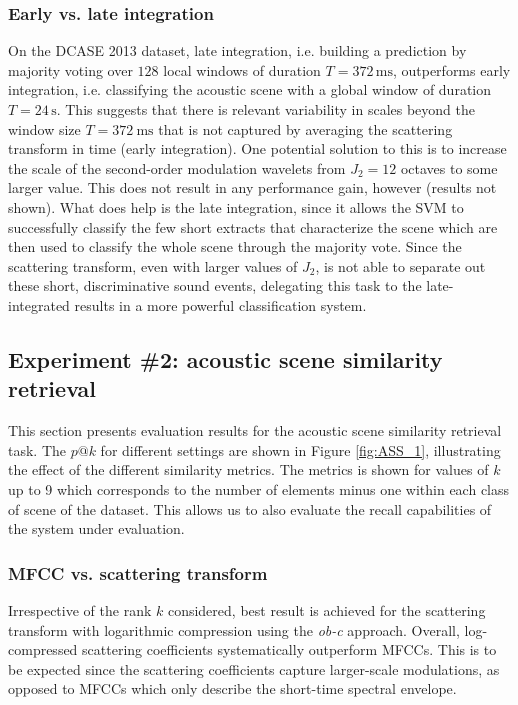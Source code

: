 \documentclass[journal]{IEEEtran}
\makeatletter
\newcommand*{\ie}{i.e.\@\xspace}
\newcommand*{\vs}{vs.\@\xspace}
\makeatother
\begin{document}
\subsubsection*{Early \vs late integration}
On the DCASE 2013 dataset, late integration, \ie building a prediction by majority voting over $128$ local windows of duration $T=372\,\mathrm{ms}$, outperforms early integration, \ie classifying the acoustic scene with a global window of duration $T=24\,\mathrm{s}$.
This suggests that there is relevant variability in scales beyond the window size $T = 372~\mathrm{ms}$ that is not captured by averaging the scattering transform in time (early integration). One potential solution to this is to increase the scale of the second-order modulation wavelets from $J_2 = 12$ octaves to some larger value. This does not result in any performance gain, however (results not shown). What does help is the late integration, since it allows the SVM to successfully classify the few short extracts that characterize the scene which are then used to classify the whole scene through the majority vote. Since the scattering transform, even with larger values of $J_2$, is not able to separate out these short, discriminative sound events, delegating this task to the late-integrated results in a more powerful classification system.

\subsection{Experiment \#2: acoustic scene similarity retrieval}

This section presents evaluation results for the acoustic scene similarity retrieval task. The $p@k$ for different settings are shown in Figure \ref{fig:ASS_1}, illustrating the effect of the different similarity metrics. The metrics is shown for values of $k$ up to 9 which corresponds to the number of elements minus one within each class of scene of the dataset. This allows us to also evaluate the recall capabilities of the system under evaluation.

\subsubsection*{MFCC \vs scattering transform}

Irrespective of the rank $k$ considered, best result is achieved for the scattering transform with logarithmic compression using the \emph{ob-c} approach. Overall, log-compressed scattering coefficients systematically outperform MFCCs. This is to be expected since the scattering coefficients capture larger-scale modulations, as opposed to MFCCs which only describe the short-time spectral envelope.
\end{document}
